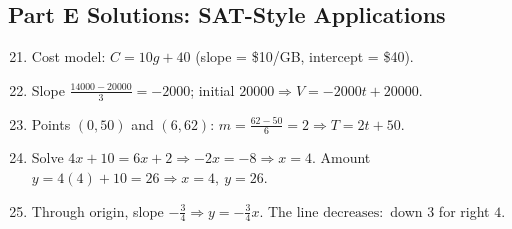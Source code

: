 \documentclass[14pt]{extarticle}
\begin{document}
\subsection*{Part E Solutions: SAT-Style Applications}
\begin{enumerate}
    \setcounter{enumi}{20}
    \item Cost model: \(\boxed{C=10g+40}\) (slope = \$10/GB, intercept = \$40).
    \item Slope \(\frac{14000-20000}{3}=-2000\); initial \(20000\Rightarrow \boxed{V=-2000t+20000}\).
    \item Points \((0,50)\) and \((6,62)\): \(m=\frac{62-50}{6}=2\Rightarrow \boxed{T=2t+50}\).
    \item Solve \(4x+10=6x+2\Rightarrow -2x=-8\Rightarrow x=4\). Amount \(y=4(4)+10=26\Rightarrow \boxed{x=4,\ y=26}\).
    \item Through origin, slope \(-\tfrac34\Rightarrow \boxed{y=-\tfrac34 x}\). The line \(\boxed{\text{decreases}}:\) down \(3\) for right \(4\).
\end{enumerate}
\end{document}
